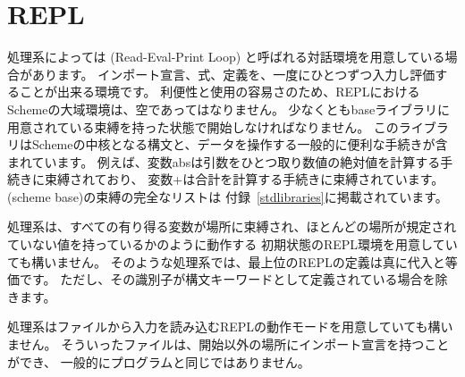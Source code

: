\section{REPL}

処理系によっては  (Read-Eval-Print Loop) と呼ばれる対話環境を用意している場合があります。
インポート宣言、式、定義を、一度にひとつずつ入力し評価することが出来る環境です。
利便性と使用の容易さのため、REPLにおけるSchemeの大域環境は、空であってはなりません。
少なくともbaseライブラリに用意されている束縛を持った状態で開始しなければなりません。
このライブラリはSchemeの中核となる構文と、データを操作する一般的に便利な手続きが含まれています。
例えば、変数{\cf abs}は引数をひとつ取り数値の絶対値を計算する手続きに束縛されており、
変数{\cf +}は合計を計算する手続きに束縛されています。
(scheme base)の束縛の完全なリストは
付録~\ref{stdlibraries}に掲載されています。

処理系は、すべての有り得る変数が場所に束縛され、ほとんどの場所が規定されていない値を持っているかのように動作する
初期状態のREPL環境を用意していても構いません。
そのような処理系では、最上位のREPLの定義は真に代入と等価です。
ただし、その識別子が構文キーワードとして定義されている場合を除きます。

処理系はファイルから入力を読み込むREPLの動作モードを用意していても構いません。
そういったファイルは、開始以外の場所にインポート宣言を持つことができ、
一般的にプログラムと同じではありません。
